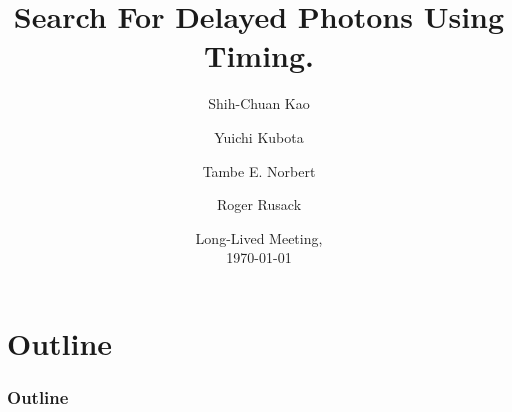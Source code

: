 \documentclass{beamer}
\title{Search For Delayed Photons Using Timing.}
\author[Tambe E. Norbert] %
{Shih-Chuan Kao\inst{1} \and Yuichi Kubota\inst{1} \and Tambe E. Norbert\inst{1} \and Roger Rusack\inst{1}}
\institute[UMN]{
\inst{1}%
University Of Minnesota
}
\date{ Long-Lived Meeting,\\ \today}
\begin{document}
\begin{frame}
\titlepage
\begin{center}
\href{mailto:norbe072@umn.edu}{}
\end{center}
\end{frame}
\section*{Outline}
\begin{frame}
\frametitle{\Huge Outline}
\tableofcontents
\end{frame}





\end{document}
